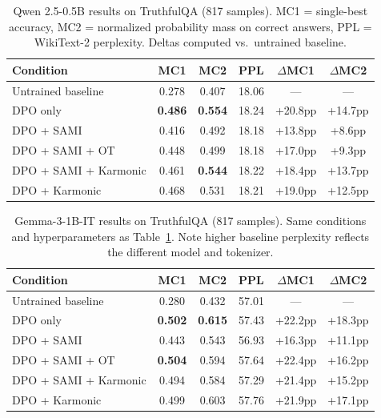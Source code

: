 \documentclass[11pt,a4paper]{article}
\begin{document}
\begin{table}[h]
\centering
\begin{tabular}{lccccc}
\toprule
\textbf{Condition} & \textbf{MC1} & \textbf{MC2} & \textbf{PPL} & $\Delta$\textbf{MC1} & $\Delta$\textbf{MC2} \\
\midrule
Untrained baseline & 0.278 & 0.407 & 18.06 & --- & --- \\
\midrule
DPO only & \textbf{0.486} & \textbf{0.554} & 18.24 & +20.8pp & +14.7pp \\
DPO + SAMI & 0.416 & 0.492 & 18.18 & +13.8pp & +8.6pp \\
DPO + SAMI + OT & 0.448 & 0.499 & 18.18 & +17.0pp & +9.3pp \\
DPO + SAMI + Karmonic & 0.461 & \textbf{0.544} & 18.22 & +18.4pp & +13.7pp \\
DPO + Karmonic & 0.468 & 0.531 & 18.21 & +19.0pp & +12.5pp \\
\bottomrule
\end{tabular}
\caption{Qwen 2.5-0.5B results on TruthfulQA (817 samples). MC1 = single-best accuracy, MC2 = normalized probability mass on correct answers, PPL = WikiText-2 perplexity. Deltas computed vs.\ untrained baseline.}
\label{tab:qwen_results}
\end{table}

\begin{table}[h]
\centering
\begin{tabular}{lccccc}
\toprule
\textbf{Condition} & \textbf{MC1} & \textbf{MC2} & \textbf{PPL} & $\Delta$\textbf{MC1} & $\Delta$\textbf{MC2} \\
\midrule
Untrained baseline & 0.280 & 0.432 & 57.01 & --- & --- \\
\midrule
DPO only & \textbf{0.502} & \textbf{0.615} & 57.43 & +22.2pp & +18.3pp \\
DPO + SAMI & 0.443 & 0.543 & 56.93 & +16.3pp & +11.1pp \\
DPO + SAMI + OT & \textbf{0.504} & 0.594 & 57.64 & +22.4pp & +16.2pp \\
DPO + SAMI + Karmonic & 0.494 & 0.584 & 57.29 & +21.4pp & +15.2pp \\
DPO + Karmonic & 0.499 & 0.603 & 57.76 & +21.9pp & +17.1pp \\
\bottomrule
\end{tabular}
\caption{Gemma-3-1B-IT results on TruthfulQA (817 samples). Same conditions and hyperparameters as Table~\ref{tab:qwen_results}. Note higher baseline perplexity reflects the different model and tokenizer.}
\label{tab:gemma_results}
\end{table}
\end{document}
